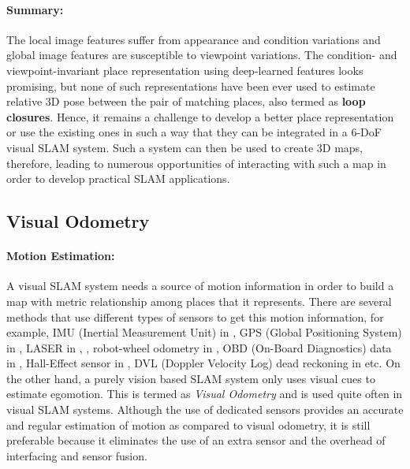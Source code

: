 \documentclass{article}
\begin{document}
\paragraph{Summary:}
The local image features suffer from appearance and condition variations and global image features are susceptible to viewpoint variations. The condition- and viewpoint-invariant place representation using deep-learned features looks promising, but none of such representations have been ever used to estimate relative 3D pose between the pair of matching places, also termed as \textbf{loop closures}. Hence, it remains a challenge to develop a better place representation or use the existing ones in such a way that they can be integrated in a 6-DoF visual SLAM system. Such a system can then be used to create 3D maps, therefore, leading to numerous opportunities of interacting with such a map in order to develop practical SLAM applications. 

\subsection{Visual Odometry}
\paragraph{Motion Estimation:} A visual SLAM system needs a source of motion information in order to build a map with metric relationship among places that it represents. There are several methods that use different types of sensors to get this motion information, for example, IMU (Inertial Measurement Unit) in \cite{Kneip2011, Milford2014}, GPS (Global Positioning System) in \cite{Agrawal2006, Floros2013}, LASER in \cite{Kohlbrecher2011}, \cite{Paul2010}, robot-wheel odometry in \cite{Bazeille2011}, OBD (On-Board Diagnostics) data in \cite{pepperell2015automatic,Pepperell2014}, Hall-Effect sensor in \cite{Pepperell2014}, DVL (Doppler Velocity Log) dead reckoning in \cite{Mahon2008} etc. On the other hand, a purely vision based SLAM system only uses visual cues to estimate egomotion. This is termed as \emph{Visual Odometry} and is used quite often in visual SLAM systems. Although the use of dedicated sensors provides an accurate and regular estimation of motion as compared to visual odometry, it is still preferable because it eliminates the use of an extra sensor and the overhead of interfacing and sensor fusion.
\end{document}
